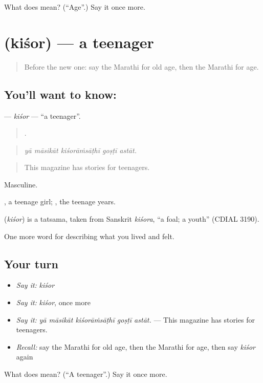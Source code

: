 \begin{tcolorbox}[breakable,colback=teal!4,colframe=teal!35!black,title={Before you move on}]
What does  mean? (\textquotedblleft{}Age\textquotedblright{}.) Say it once more.
\end{tcolorbox}
\section[\texorpdfstring{\mr{किशोर} (kiśor)}{किशोर (kiśor)}]{ (kiśor) — a teenager}

\label{lesson:MR-C498-kisor}



\begin{quote}
Before the new one: say the Marathi for old age, then the Marathi for age.
\end{quote}

\subsection*{You'll want to know: }
\textbf{} — \emph{kiśor} — \textquotedblleft{}a teenager\textquotedblright{}.

\begin{quote}
    .
\end{quote}

\begin{quote}
\emph{yā māsikāt kiśorāṁsāṭhī goṣṭī astāt.}
\end{quote}

\begin{quote}
This magazine has stories for teenagers.
\end{quote}

Masculine.

, a teenage girl; , the teenage years.

\begin{cousinweb}
\textbf{} (\emph{kiśor}) is a tatsama, taken from Sanskrit \emph{kiśora}, \textquotedblleft{}a foal; a youth\textquotedblright{} (CDIAL 3190).
\end{cousinweb}

\begin{grammarlens}[title={What you've built}]
One more word for describing what you lived and felt.
\end{grammarlens}

\subsection*{Your turn}
\begin{itemize}
\raggedright
  \item \emph{Say it:} \emph{kiśor}
  \item \emph{Say it:} \emph{kiśor}, once more
  \item \emph{Say it:} \emph{yā māsikāt kiśorāṁsāṭhī goṣṭī astāt.} — This magazine has stories for teenagers.
  \item \emph{Recall:} say the Marathi for old age, then the Marathi for age, then say \emph{kiśor} again
\end{itemize}

\begin{tcolorbox}[breakable,colback=teal!4,colframe=teal!35!black,title={Before you move on}]
What does  mean? (\textquotedblleft{}A teenager\textquotedblright{}.) Say it once more.
\end{tcolorbox}
